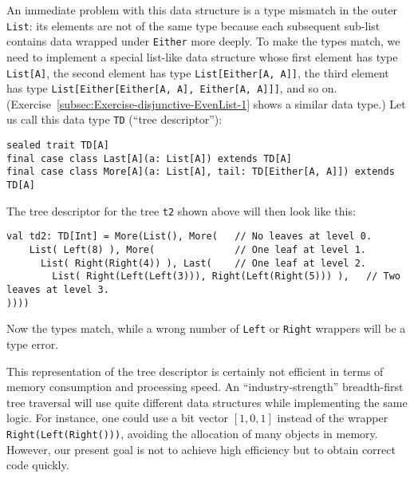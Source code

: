 An immediate problem with this data structure is a type mismatch in
the outer \lstinline!List!: its elements are not of the same type
because each subsequent sub-list contains data wrapped under \lstinline!Either!
more deeply. To make the types match, we need to implement a special
list-like data structure whose first element has type \lstinline!List[A]!,
the second element has type \lstinline!List[Either[A, A]]!, the third
element has type \lstinline!List[Either[Either[A, A], Either[A, A]]]!,
and so on. (Exercise~\ref{subsec:Exercise-disjunctive-EvenList-1}
shows a similar data type.) Let us call this data type \lstinline!TD!
(\textsf{``}tree descriptor\textsf{''}):
\begin{lstlisting}
sealed trait TD[A]
final case class Last[A](a: List[A]) extends TD[A]
final case class More[A](a: List[A], tail: TD[Either[A, A]]) extends TD[A]  
\end{lstlisting}
The tree descriptor for the tree \lstinline!t2! shown above will
then look like this:
\begin{lstlisting}
val td2: TD[Int] = More(List(), More(   // No leaves at level 0.
    List( Left(8) ), More(              // One leaf at level 1.
      List( Right(Right(4)) ), Last(    // One leaf at level 2.
        List( Right(Left(Left(3))), Right(Left(Right(5))) ),   // Two leaves at level 3.
))))
\end{lstlisting}
Now the types match, while a wrong number of \lstinline!Left! or
\lstinline!Right! wrappers will be a type error.

This representation of the tree descriptor is certainly not efficient
in terms of memory consumption and processing speed. An \textsf{``}industry-strength\textsf{''}
breadth-first tree traversal will use quite different data structures
while implementing the same logic. For instance, one could use a bit
vector $\left[1,0,1\right]$ instead of the wrapper \lstinline!Right(Left(Right()))!,
avoiding the allocation of many objects in memory. However, our present
goal is not to achieve high efficiency but to obtain correct code
quickly.

